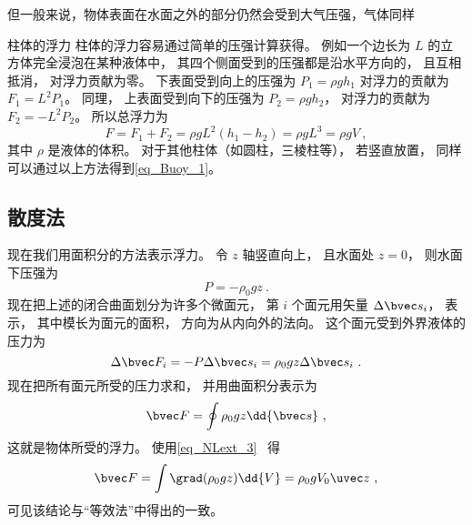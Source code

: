 但一般来说，物体表面在水面之外的部分仍然会受到大气压强，气体同样

\begin{example}{柱体的浮力}
柱体的浮力容易通过简单的压强计算获得。 例如一个边长为 $L$ 的立方体完全浸泡在某种液体中， 其四个侧面受到的压强都是沿水平方向的， 且互相抵消， 对浮力贡献为零。 下表面受到向上的压强为 $P_1 = \rho g h_1$ 对浮力的贡献为 $F_1 = L^2 P_1$。 同理， 上表面受到向下的压强为 $P_2 = \rho g h_2$， 对浮力的贡献为 $F_2 = -L^2 P_2$。 所以总浮力为
\begin{equation}
F = F_1 + F_2 = \rho g L^2 (h_1 - h_2) = \rho g L^3 = \rho g V~,
\end{equation}
其中 $\rho$ 是液体的体积。 对于其他柱体（如圆柱，三棱柱等）， 若竖直放置， 同样可以通过以上方法得到\autoref{eq_Buoy_1}。
\end{example}

\subsection{散度法}

现在我们用面积分的方法表示浮力。 令 $z$ 轴竖直向上， 且水面处 $z = 0$， 则水面下压强为
\begin{equation}
P = -\rho_0 g z~.
\end{equation}
现在把上述的闭合曲面划分为许多个微面元， 第 $i$ 个面元用矢量 $\Delta \bvec s_i$， 表示， 其中模长为面元的面积， 方向为从内向外的法向。 这个面元受到外界液体的压力为
\begin{equation}
\Delta \bvec F_i = -P\Delta \bvec s_i = \rho_0 g z \Delta \bvec s_i~.
\end{equation}
现在把所有面元所受的压力求和， 并用曲面积分表示为
\begin{equation}
\bvec F = \oint \rho_0 g z \dd{\bvec s}~,
\end{equation}
这就是物体所受的浮力。 使用\autoref{eq_NLext_3}~ 得
\begin{equation}
\bvec F = \int \grad(\rho_0 g z) \dd{V} = \rho_0 g V_0 \uvec z~,
\end{equation}
可见该结论与“等效法”中得出的一致。
